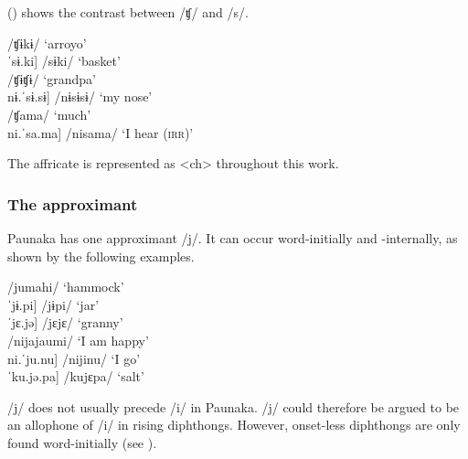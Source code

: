 () shows the contrast between /ʧ/ and /s/.
    
\ea\label{ex:ch-s}
\ea     \tab[ˈʧɨ.kɨ] \tab /ʧɨkɨ/ \tab\tab ‘arroyo’\\
     \tab{[}ˈsɨ.ki] \tab /sɨki/ \tab\tab ‘basket’\\
\ex  \tab[ˈʧɨ.ʧɨ] \tab /ʧɨʧɨ/ \tab\tab ‘grandpa’\\
     \tab{[}nɨ.ˈsɨ.sɨ] \tab /nɨsɨsɨ/ \tab ‘my nose’\\
\ex  \tab[ˈʧa.ma] \tab /ʧama/ \tab ‘much’\\
     \tab{[}ni.ˈsa.ma] \tab /nisama/ \tab ‘I hear (\textsc{irr})’\\%
\z
\xe    %

The affricate is represented as <ch> throughout this work.

\subsubsection{The approximant}
Paunaka has one approximant /j/. It can occur word-initially and -internally, as shown by the following examples.

\ea\label{ex:j}
\ea     \tab[ju.ˈma.hĩ] \tab\tab /jumahi/ \tab ‘hammock’\\
     \tab{[}ˈjɨ.pi] \tab\tab /jɨpi/ \tab\tab ‘jar’\\
     \tab{[}ˈjɛ.jǝ] \tab\tab /jɛjɛ/ \tab\tab ‘granny’\\
\ex     \tab[ni.ja.ˈjau.mi] \tab /nijajaumi/ \tab ‘I am happy’\\
     \tab{[}ni.ˈju.nu] \tab\tab /nijinu/ \tab ‘I go’\\
     \tab{[}ˈku.jə.pa] \tab\tab /kujɛpa/ \tab ‘salt’\\%
\z
\xe   

/j/ does not usually precede /i/ in Paunaka. /j/ could therefore be argued to be an allophone of /i/ in rising diphthongs. However, onset-less diphthongs are only found word-initially (see ).  

